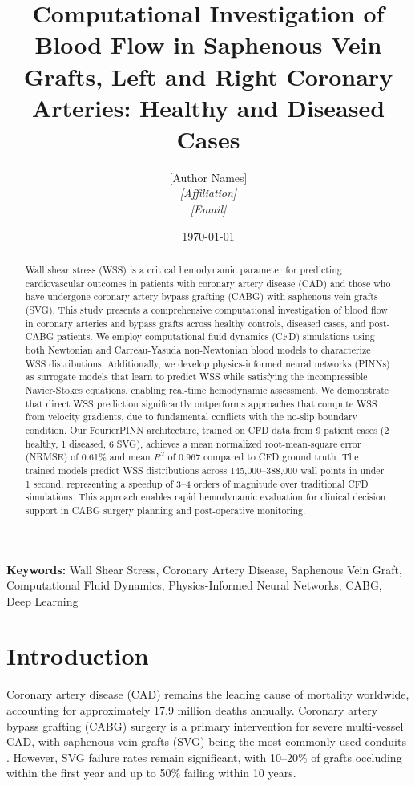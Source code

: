 \documentclass[12pt,a4paper]{article}
\title{Computational Investigation of Blood Flow in Saphenous Vein Grafts, Left and Right Coronary Arteries: Healthy and Diseased Cases}
\author{
    [Author Names] \\
    \textit{[Affiliation]} \\
    \textit{[Email]}
}
\date{\today}
\begin{document}
\maketitle

\begin{abstract}
Wall shear stress (WSS) is a critical hemodynamic parameter for predicting cardiovascular outcomes in patients with coronary artery disease (CAD) and those who have undergone coronary artery bypass grafting (CABG) with saphenous vein grafts (SVG). This study presents a comprehensive computational investigation of blood flow in coronary arteries and bypass grafts across healthy controls, diseased cases, and post-CABG patients. We employ computational fluid dynamics (CFD) simulations using both Newtonian and Carreau-Yasuda non-Newtonian blood models to characterize WSS distributions. Additionally, we develop physics-informed neural networks (PINNs) as surrogate models that learn to predict WSS while satisfying the incompressible Navier-Stokes equations, enabling real-time hemodynamic assessment. We demonstrate that direct WSS prediction significantly outperforms approaches that compute WSS from velocity gradients, due to fundamental conflicts with the no-slip boundary condition. Our FourierPINN architecture, trained on CFD data from 9 patient cases (2 healthy, 1 diseased, 6 SVG), achieves a mean normalized root-mean-square error (NRMSE) of 0.61\% and mean $R^2$ of 0.967 compared to CFD ground truth. The trained models predict WSS distributions across 145,000--388,000 wall points in under 1 second, representing a speedup of 3--4 orders of magnitude over traditional CFD simulations. This approach enables rapid hemodynamic evaluation for clinical decision support in CABG surgery planning and post-operative monitoring.
\end{abstract}

\textbf{Keywords:} Wall Shear Stress, Coronary Artery Disease, Saphenous Vein Graft, Computational Fluid Dynamics, Physics-Informed Neural Networks, CABG, Deep Learning

\section{Introduction}

Coronary artery disease (CAD) remains the leading cause of mortality worldwide, accounting for approximately 17.9 million deaths annually. Coronary artery bypass grafting (CABG) surgery is a primary intervention for severe multi-vessel CAD, with saphenous vein grafts (SVG) being the most commonly used conduits \cite{cabg_outcomes}. However, SVG failure rates remain significant, with 10--20\% of grafts occluding within the first year and up to 50\% failing within 10 years.
\end{document}
